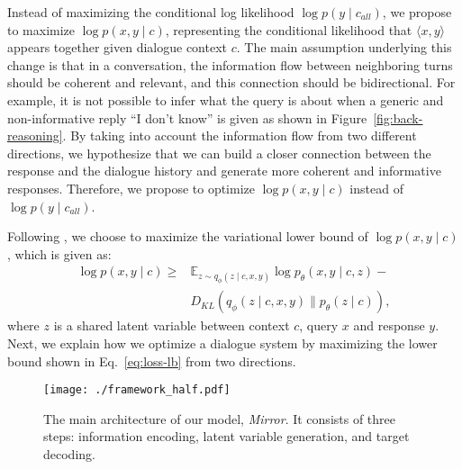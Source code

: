 \documentclass[sigconf]{acmart}
\begin{document}
Instead of maximizing the conditional log likelihood $\log p(y \mid c_{all})$, we propose to maximize $\log p(x,y \mid c)$, representing the conditional likelihood that $\langle x,y\rangle$ appears together given dialogue context $c$. 
The main assumption underlying this change is that in a conversation, the information flow between neighboring turns should be coherent and relevant, and this connection should be bidirectional. 
For example, it is not possible to infer what the query is about when a generic and non-informative reply ``I don't know'' is given as shown in Figure~\ref{fig:back-reasoning}. 
By taking into account the information flow from two different directions, we hypothesize that we can build a closer connection between the response and the dialogue history and generate more coherent and informative responses. Therefore, we propose to optimize $\log p(x,y \mid c)$ instead of $\log p(y\mid c_{all})$. 

Following \cite{kingma2013auto,shen2017conditional}, we choose to maximize the variational lower bound of $\log p(x,y \mid c)$, which is given as:
%
\begin{equation}
\begin{split}
\log p(x,y \mid c) \geq {} & \mathbb{E}_{z \sim q_\phi(z \mid c, x, y)} \log p_\theta (x, y \mid c, z)  - {}\\
& D_\mathit{KL}(q_\phi(z \mid c, x, y) \| p_\theta(z \mid c)),
\end{split}
\label{eq:loss-lb}
\end{equation}
%
where $z$ is a shared latent variable between context $c$, query $x$ and response $y$.  
Next, we explain how we optimize a dialogue system by maximizing the lower bound shown in  Eq.~\ref{eq:loss-lb} from two directions.

\begin{figure}[t]
\centering
   \texttt{[image: ./framework\_half.pdf]}
   \caption{The main architecture of our model, \emph{Mirror}. It consists of three steps: information encoding, latent variable generation, and target decoding. }
   \vspace*{-0.5\baselineskip}
   \label{fig:framework}
\end{figure} 

  
\end{document}
